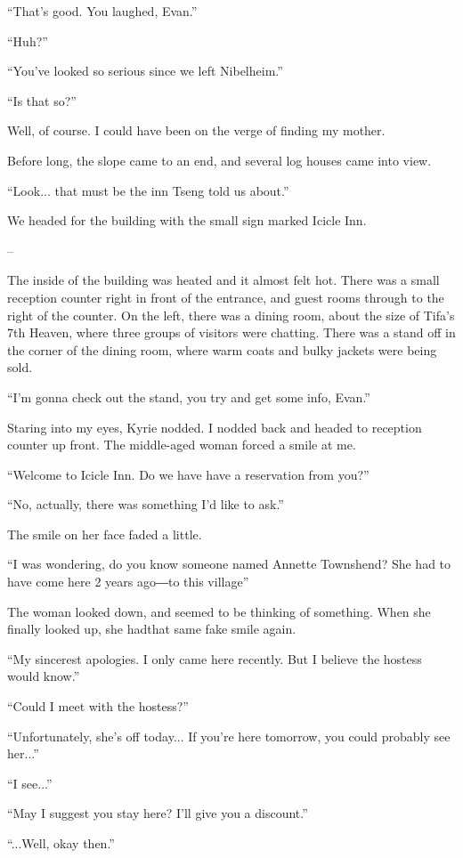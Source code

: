 \documentclass[oneside]{book}
\begin{document}
“That’s good. You laughed, Evan.”

“Huh?”

“You’ve looked so serious since we left Nibelheim.”

“Is that so?”

Well, of course. I could have been on the verge of finding my mother.

Before long, the slope came to an end, and several log houses came into view.

“Look... that must be the inn Tseng told us about.”

We headed for the building with the small sign marked Icicle Inn.

–

The inside of the building was heated and it almost felt hot. There was a small reception counter right in front of the entrance, and guest rooms through to the right of the counter. On the left, there was a dining room, about the size of Tifa’s 7th Heaven, where three groups of visitors were chatting. There was a stand off in the corner of the dining room, where warm coats and bulky jackets were being sold.

“I’m gonna check out the stand, you try and get some info, Evan.”

Staring into my eyes, Kyrie nodded. I nodded back and headed to reception counter up front. The middle-aged woman forced a smile at me.

“Welcome to Icicle Inn. Do we have have a reservation from you?”

“No, actually, there was something I’d like to ask.”

The smile on her face faded a little.

“I was wondering, do you know someone named Annette Townshend? She had to have come here 2 years ago―to this village”

The woman looked down, and seemed to be thinking of something. When she finally looked up, she hadthat same fake smile again.

“My sincerest apologies. I only came here recently. But I believe the hostess would know.”

“Could I meet with the hostess?”

“Unfortunately, she’s off today... If you’re here tomorrow, you could probably see her...”

“I see...”

“May I suggest you stay here? I’ll give you a discount.”

“...Well, okay then.”
\end{document}
